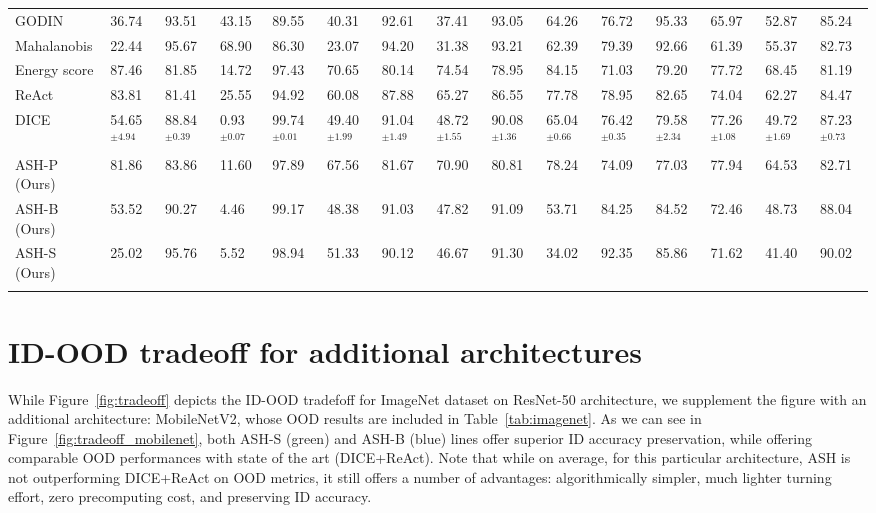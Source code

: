 \documentclass{article}
\newcommand{\figref}[1]{Figure~\ref{fig:#1}}
\newcommand{\tablabel}[1]{\label{tab:#1}}
\newcommand{\tabref}[1]{Table~\ref{tab:#1}}
\begin{document}
\begin{sidewaystable}
{\begin{tabular}{lllllllllllllll}
GODIN & 36.74 & 93.51 & 43.15 & 89.55 & 40.31 & 92.61 & 37.41 & 93.05 & 64.26 & 76.72 & 95.33 & 65.97 & 52.87 & 85.24 \\ 
Mahalanobis & 22.44 & 95.67 & 68.90 & 86.30 & 23.07 & 94.20 & 31.38 & 93.21 & 62.39 & 79.39 & 92.66 & 61.39 & 55.37 & 82.73 \\
Energy score & 87.46 & 81.85 & 14.72 & 97.43 & 70.65 & 80.14 & 74.54 & 78.95 & 84.15 & 71.03 & 79.20 & 77.72 & 68.45 & 81.19 \\ 
ReAct & 83.81 & 81.41 & 25.55 & 94.92 & 60.08 & 87.88 & 65.27 & 86.55 & 77.78 & 78.95 & 82.65 & 74.04 & 62.27 & 84.47 \\
{DICE} & 54.65$^{\pm{4.94}}$ & 88.84$^{\pm{0.39}}$ & 0.93$^{\pm{0.07}}$ & 99.74$^{\pm{0.01}}$ & 49.40$^{\pm{1.99}}$ & 91.04$^{\pm{1.49}}$ & 48.72$^{\pm{1.55}}$ & 90.08$^{\pm{1.36}}$ & 65.04$^{\pm{0.66}}$ & 76.42$^{\pm{0.35}}$ & 79.58$^{\pm{2.34}}$ & 77.26$^{\pm{1.08}}$ & 49.72$^{\pm{1.69}}$ & 87.23$^{\pm{0.73}}$ \\

\rowcolor{lightgray}ASH-P (Ours) & 81.86 & 83.86 & 11.60 & 97.89 & 67.56 & 81.67 & 70.90 & 80.81 & 78.24 & 74.09 & 77.03 & 77.94 & 64.53 & 82.71\\
\rowcolor{lightgray}ASH-B (Ours) & 53.52 & 90.27 & 4.46 & 99.17 & 48.38 & 91.03 & 47.82 & 91.09 & 53.71 & 84.25 & 84.52 & 72.46 & 48.73 & 88.04 \\
\rowcolor{lightgray}ASH-S (Ours) & 25.02 & 95.76 & 5.52 & 98.94 & 51.33 & 90.12 & 46.67 & 91.30 & 34.02 & 92.35 & 85.86 & 71.62 & 41.40 & 90.02 \\
\\ \bottomrule
\end{tabular}}
\tablabel{detailresultscifar100}
\end{sidewaystable}


\section{ID-OOD tradeoff for additional architectures}

While \figref{tradeoff} depicts the ID-OOD tradefoff for ImageNet dataset on ResNet-50 architecture, we supplement the figure with an additional architecture: MobileNetV2, whose OOD results are included in \tabref{imagenet}. As we can see in \figref{tradeoff_mobilenet}, both ASH-S (green) and ASH-B (blue) lines offer superior ID accuracy preservation, while offering comparable OOD performances with state of the art (DICE+ReAct). Note that while on average, for this particular architecture, ASH is not outperforming DICE+ReAct on OOD metrics, it still offers a number of advantages: algorithmically simpler, much lighter turning effort, zero precomputing cost, and preserving ID accuracy.
\end{document}
